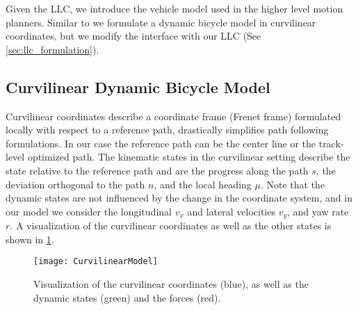 Given the LLC, we introduce the vehicle model used in the higher level motion planners. Similar to \cite{vazquez2020optimization} we formulate a dynamic bicycle model in curvilinear coordinates, but we modify the interface with our LLC (See \cref{sec:llc_formulation}). 

\subsection{Curvilinear Dynamic Bicycle Model}
\label{sec:curv_model}
Curvilinear coordinates describe a coordinate frame (Frenet frame) formulated locally with respect to a reference path, drastically simplifies path following formulations. In our case the reference path can be the center line or the track-level optimized path. The kinematic states in the curvilinear setting describe the state relative to the reference path and are the progress along the path $s$, the deviation orthogonal to the path $n$, and the local heading $\mu$. Note that the dynamic states are not influenced by the change in the coordinate system, and in our model we consider the longitudinal $v_x$ and lateral velocities $v_y$, and yaw rate $r$. A visualization of the curvilinear coordinates as well as the other states is shown in \cref{fig:model}. 

\begin{figure}[h]
    \centering
    \texttt{[image: CurvilinearModel]}
    \caption{Visualization of the curvilinear coordinates (blue), as well as the dynamic states (green) and the forces (red).}
    \label{fig:model}
\end{figure}

